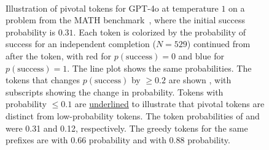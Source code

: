 \documentclass[11pt]{article}
\begin{document}
\begin{figure}
\begin{AIbox}{}
    \tt \footnotesize
    \begin{minipage}{0.95\textwidth}
    
    \vspace{-1em}
    \end{minipage}
    
    \vspace{-2.5em}
    \end{AIbox}
    \caption{Illustration of pivotal tokens for GPT-4o at temperature $1$ on a problem from the MATH benchmark~\cite{hendrycksmath2021}, where the
 initial success probability is $0.31$. Each token is colorized by the probability of success for an independent completion ($N=529$) continued from after the token, with \textcolor{red!100!black}{red for $p(\mathrm{success})=0$} and \textcolor{blue!100!black}{blue for $p(\mathrm{success})=1$}. The line plot shows the same probabilities. The tokens that changes $p(\mathrm{success})$ by $\ge 0.2$ are shown , with subscripts showing the change in probability. Tokens with probability $\leq 0.1$ are \underline{underlined} to illustrate that pivotal tokens are distinct from low-probability tokens. The token probabilities of  and  were 0.31 and 0.12, respectively. The greedy tokens for the same prefixes are  with 0.66 probability and  with 0.88 probability.}
    \label{fig:pivotal-token-example}
\end{figure}
\end{document}
